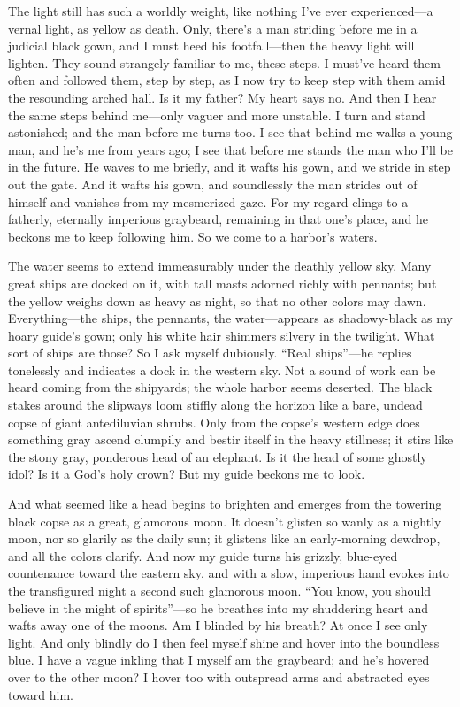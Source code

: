 \documentclass[12pt,a4paper]{article}
\begin{document}
The light still has such a worldly weight, like nothing I’ve ever experienced—a vernal light, as yellow as death. Only, there’s a man striding before me in a judicial black gown, and I must heed his footfall—then the heavy light will lighten. They sound strangely familiar to me, these steps. I must’ve heard them often and followed them, step by step, as I now try to keep step with them amid the resounding arched hall. Is it my father? My heart says no. And then I hear the same steps behind me—only vaguer and more unstable. I turn and stand astonished; and the man before me turns too. I see that behind me walks a young man, and he’s me from years ago; I see that before me stands the man who I’ll be in the future. He waves to me briefly, and it wafts his gown, and we stride in step out the gate. And it wafts his gown, and soundlessly the man strides out of himself and vanishes from my mesmerized gaze. For my regard clings to a fatherly, eternally imperious graybeard, remaining in that one’s place, and he beckons me to keep following him. So we come to a harbor’s waters.

The water seems to extend immeasurably under the deathly yellow sky. Many great ships are docked on it, with tall masts adorned richly with pennants; but the yellow weighs down as heavy as night, so that no other colors may dawn. Everything—the ships, the pennants, the water—appears as shadowy-black as my hoary guide’s gown; only his white hair shimmers silvery in the twilight. What sort of ships are those? So I ask myself dubiously. “Real ships”—he replies tonelessly and indicates a dock in the western sky. Not a sound of work can be heard coming from the shipyards; the whole harbor seems deserted. The black stakes around the slipways loom stiffly along the horizon like a bare, undead copse of giant antediluvian shrubs. Only from the copse’s western edge does something gray ascend clumpily and bestir itself in the heavy stillness; it stirs like the stony gray, ponderous head of an elephant. Is it the head of some ghostly idol? Is it a God’s holy crown? But my guide beckons me to look.

And what seemed like a head begins to brighten and emerges from the towering black copse as a great, glamorous moon. It doesn’t glisten so wanly as a nightly moon, nor so glarily as the daily sun; it glistens like an early-morning dewdrop, and all the colors clarify. And now my guide turns his grizzly, blue-eyed countenance toward the eastern sky, and with a slow, imperious hand evokes into the transfigured night a second such glamorous moon. “You know, you should believe in the might of spirits”—so he breathes into my shuddering heart and wafts away one of the moons. Am I blinded by his breath? At once I see only light. And only blindly do I then feel myself shine and hover into the boundless blue. I have a vague inkling that I myself am the graybeard; and he’s hovered over to the other moon? I hover too with outspread arms and abstracted eyes toward him.
\end{document}
